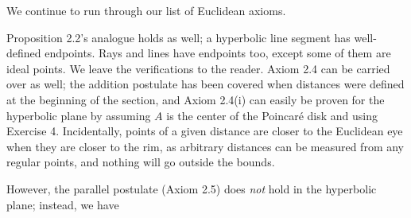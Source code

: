 \documentclass[leqno]{book}
\begin{document}
\noindent We continue to run through our list of Euclidean axioms. %

Proposition 2.2's analogue holds as well; a hyperbolic line segment has well-defined endpoints.  Rays and lines have endpoints too, except some of them are ideal points.  We leave the verifications to the reader.  Axiom 2.4 can be carried over as well; the addition postulate has been covered when distances were defined at the beginning of the section, and Axiom 2.4(i) can easily be proven for the hyperbolic plane by assuming $A$ is the center of the Poincar\'e disk and using Exercise 4.  Incidentally, points of a given distance are closer to the Euclidean eye when they are closer to the rim, as arbitrary distances can be measured from any regular points, and nothing will go outside the bounds.

However, the parallel postulate (Axiom 2.5) does \emph{not} hold in the hyperbolic plane; instead, we have\\
\end{document}
